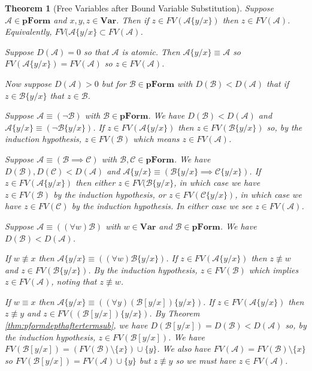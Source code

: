 \documentclass[12pt]{article}
\theoremstyle{break}
\theoremstyle{break}
\newtheorem{theorem}{Theorem}[section]
\theoremstyle{break}
\theoremstyle{break}
\theoremstyle{break}
\newtheorem{informal definition}[definition]{Informal Definition}
\newcommand{\mc}[1]{\mathcal{#1}}
\begin{document}
\begin{theorem}[Free Variables after Bound Variable Substitution]
Suppose $\mc{A}\in\textbf{pForm}$ and $x, y, z\in\textbf{Var}$.
Then if $z\in FV(\mc{A}\{y/x\})$ then $z\in FV(\mc{A})$.
Equivalently, $FV(\mc{A}\{y/x\} \subset FV(\mc{A})$.

Suppose $D(\mc{A})=0$ so that $\mc{A}$ is atomic.
Then $\mc{A}\{y/x\} \equiv \mc{A}$ so $FV(\mc{A}\{y/x\}) = FV(\mc{A})$ so $z\in FV(\mc{A})$.

Now suppose $D(\mc{A})>0$ but for $\mc{B}\in\textbf{pForm}$ with $D(\mc{B})<D(\mc{A})$ that if $z\in \mc{B}\{y/x\}$ that $z\in \mc{B}$.

Suppose $\mc{A}\equiv (\lnot \mc{B})$ with $\mc{B}\in\textbf{pForm}$.
We have $D(\mc{B}) < D(\mc{A})$ and $\mc{A}\{y/x\} \equiv (\lnot \mc{B}\{y/x\})$.
If $z\in FV(\mc{A}\{y/x\})$ then $z\in FV(\mc{B}\{y/x\})$ so, by the induction hypothesis, $z\in FV(\mc{B})$ which means $z\in FV(\mc{A})$.

Suppose $\mc{A}\equiv(\mc{B}\implies \mc{C})$ with $\mc{B}, \mc{C}\in\textbf{pForm}$.
We have $D(\mc{B}), D(\mc{C}) < D(\mc{A})$ and $\mc{A}\{y/x\} \equiv (\mc{B}\{y/x\} \implies \mc{C}\{y/x\})$.
If $z\in FV(\mc{A}\{y/x\})$ then either $z\in FV(\mc{B}\{y/x\}$, in which case we have $z\in FV(\mc{B})$ by the induction hypothesis, or $z\in FV(\mc{C}\{y/x\})$, in which case we have $z\in FV(\mc{C})$ by the induction hypothesis.
In either case we see $z\in FV(\mc{A})$.

Suppose $\mc{A}\equiv ((\forall w)\mc{B})$ with $w\in\textbf{Var}$ and $\mc{B}\in\textbf{pForm}$.
We have $D(\mc{B}) < D(\mc{A})$.

If $w\not \equiv x$ then $\mc{A}\{y/x\} \equiv ((\forall w) \mc{B}\{y/x\})$.
If $z\in FV(\mc{A}\{y/x\})$ then $z\not \equiv w$ and $z\in FV(\mc{B}\{y/x\})$.
By the induction hypothesis, $z\in FV(\mc{B})$ which implies $z\in FV(\mc{A})$, noting that $z\not \equiv w$.

If $w\equiv x$ then $\mc{A}\{y/x\} \equiv ((\forall y) (\mc{B}[y/x])\{y/x\})$.
If $z\in FV(\mc{A}\{y/x\})$ then $z\not \equiv y$ and $z\in FV((\mc{B}[y/x])\{y/x\})$.
By Theorem \ref{thm:pformdepthaftertermsub}, we have $D(\mc{B}[y/x]) = D(\mc{B}) < D(\mc{A})$ so, by the induction hypothesis, $z\in FV(\mc{B}[y/x])$.
We have $FV(\mc{B}[y/x]) = (FV(\mc{B})\setminus \{x\}) \cup \{y\}$.
We also have $FV(\mc{A}) = FV(\mc{B}) \setminus \{x\}$ so $FV(\mc{B}[y/x]) = FV(\mc{A}) \cup \{y\}$ but $z\not \equiv y$ so we must have $z\in FV(\mc{A})$.


\end{theorem}
\end{document}
